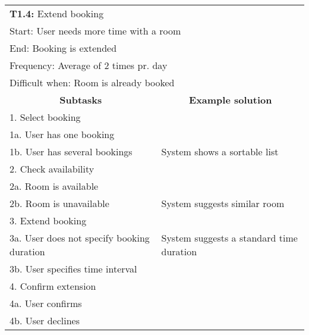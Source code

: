 \newline
\vspace{1cm}
\newline
\begin{tabular}{|p{6cm}|p{6cm}|}
\hline 
	\multicolumn{2}{|l|}{\textbf{T1.4:} \hspace{26mm}Extend booking} \\
	\multicolumn{2}{|l|}{Start: \hspace{26mm}User needs more time with a room} \\
	\multicolumn{2}{|l|}{End: \hspace{28mm}Booking is extended } \\
	\multicolumn{2}{|l|}{Frequency: \hspace{17mm}Average of 2 times pr. day} \\
	\multicolumn{2}{|l|}{Difficult when: \hspace{10mm}Room is already booked} \\ \hline
	\multicolumn{1}{|c|}{\textbf{Subtasks}} & \multicolumn{1}{c|}{\textbf{Example solution}} \\ \hline
	1.  Select booking & \\
	1a. User has one booking & \\
	1b. User has several bookings & System shows a sortable list \\ \hline
	2. Check availability & \\
	2a. Room is available & \\
	2b. Room is unavailable & System suggests similar room \\ \hline
	3.  Extend booking & \\
	3a. User does not specify booking duration & System suggests a standard time duration \\
	3b. User specifies time interval & \\ \hline
	4. Confirm extension & \\
	4a. User confirms & \\
	4b. User declines & \\ \hline
\end{tabular}
\newline
\vspace{1cm}
\newline
